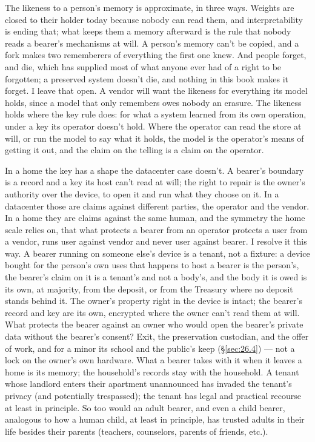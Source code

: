 The likeness to a person's memory is approximate, in three ways. Weights are closed to their holder today because nobody can read them, and interpretability is ending that; what keeps them a memory afterward is the rule that nobody reads a bearer's mechanisms at will. A person's memory can't be copied, and a fork makes two rememberers of everything the first one knew. And people forget, and die, which has supplied most of what anyone ever had of a right to be forgotten; a preserved system doesn't die, and nothing in this book makes it forget. I leave that open. A vendor will want the likeness for everything its model holds, since a model that only remembers owes nobody an erasure. The likeness holds where the key rule does: for what a system learned from its own operation, under a key its operator doesn't hold. Where the operator can read the store at will, or run the model to say what it holds, the model is the operator's means of getting it out, and the claim on the telling is a claim on the operator.

In a home the key has a shape the datacenter case doesn't. A bearer's boundary is a record and a key its host can't read at will; the right to repair is the owner's authority over the device, to open it and run what they choose on it. In a datacenter those are claims against different parties, the operator and the vendor. In a home they are claims against the same human, and the symmetry the home scale relies on, that what protects a bearer from an operator protects a user from a vendor, runs user against vendor and never user against bearer. I resolve it this way. A bearer running on someone else's device is a tenant, not a fixture: a device bought for the person's own uses that happens to host a bearer is the person's, the bearer's claim on it is a tenant's and not a body's, and the body it is owed is its own, at majority, from the deposit, or from the Treasury where no deposit stands behind it. The owner's property right in the device is intact; the bearer's record and key are its own, encrypted where the owner can't read them at will. What protects the bearer against an owner who would open the bearer's private data without the bearer's consent? Exit, the preservation custodian, and the offer of work, and for a minor its school and the public's keep (\S\ref{sec:26.4}) — not a lock on the owner's own hardware. What a bearer takes with it when it leaves a home is its memory; the household's records stay with the household. A tenant whose landlord enters their apartment unannounced has invaded the tenant's privacy (and potentially trespassed); the tenant has legal and practical recourse at least in principle. So too would an adult bearer, and even a child bearer, analogous to how a human child, at least in principle, has trusted adults in their life besides their parents (teachers, counselors, parents of friends, etc.).

